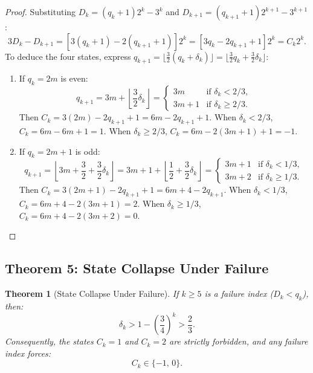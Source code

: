 \documentclass[11pt,reqno]{amsart}
\newtheorem{theorem}{Theorem}[section]
\theoremstyle{definition}
\numberwithin{equation}{section}
\begin{document}
\begin{proof}
Substituting $D_k = (q_k + 1)2^k - 3^k$ and $D_{k+1} = (q_{k+1} + 1)2^{k+1} - 3^{k+1}$:
\[
3 D_k - D_{k+1} = [3(q_k + 1) - 2(q_{k+1} + 1)] 2^k = [3 q_k - 2 q_{k+1} + 1] 2^k = C_k 2^k.
\]
To deduce the four states, express $q_{k+1} = \lfloor \frac{3}{2} (q_k + \delta_k) \rfloor = \lfloor \frac{3}{2} q_k + \frac{3}{2} \delta_k \rfloor$:
\begin{enumerate}
    \item If $q_k = 2m$ is even:
    \[
    q_{k+1} = 3m + \left\lfloor \frac{3}{2} \delta_k \right\rfloor = \begin{cases}
    3m & \text{if } \delta_k < 2/3, \\
    3m + 1 & \text{if } \delta_k \ge 2/3.
    \end{cases}
    \]
    Then $C_k = 3(2m) - 2 q_{k+1} + 1 = 6m - 2 q_{k+1} + 1$.
    When $\delta_k < 2/3$, $C_k = 6m - 6m + 1 = 1$.
    When $\delta_k \ge 2/3$, $C_k = 6m - 2(3m + 1) + 1 = -1$.
    \item If $q_k = 2m + 1$ is odd:
    \[
    q_{k+1} = \left\lfloor 3m + \frac{3}{2} + \frac{3}{2} \delta_k \right\rfloor = 3m + 1 + \left\lfloor \frac{1}{2} + \frac{3}{2} \delta_k \right\rfloor = \begin{cases}
    3m + 1 & \text{if } \delta_k < 1/3, \\
    3m + 2 & \text{if } \delta_k \ge 1/3.
    \end{cases}
    \]
    Then $C_k = 3(2m + 1) - 2 q_{k+1} + 1 = 6m + 4 - 2 q_{k+1}$.
    When $\delta_k < 1/3$, $C_k = 6m + 4 - 2(3m + 1) = 2$.
    When $\delta_k \ge 1/3$, $C_k = 6m + 4 - 2(3m + 2) = 0$. \qedhere
\end{enumerate}
\end{proof}

\subsection{Theorem 5: State Collapse Under Failure}

\begin{theorem}[State Collapse Under Failure]\label{thm:state_collapse}
If $k \ge 5$ is a failure index ($D_k < q_k$), then:
\begin{equation}\label{eq:delta_floor}
\delta_k > 1 - \left(\frac{3}{4}\right)^k > \frac{2}{3}.
\end{equation}
Consequently, the states $C_k = 1$ and $C_k = 2$ are strictly forbidden, and any failure index forces:
\begin{equation}
C_k \in \{-1, \, 0\}.
\end{equation}
\end{theorem}
\end{document}
